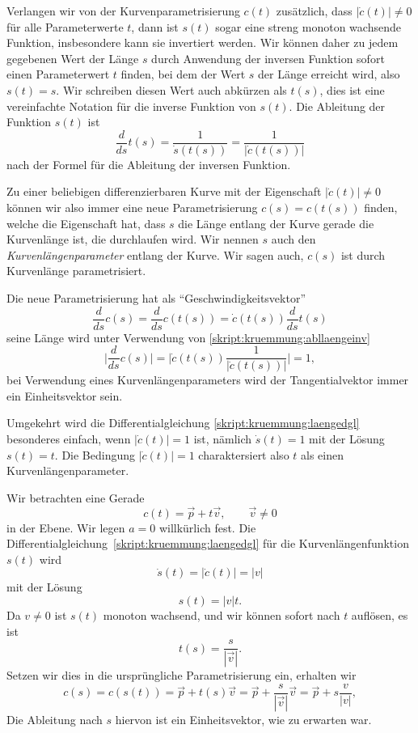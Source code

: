 Verlangen wir von der Kurvenparametrisierung $c(t)$ zusätzlich,
dass $|\dot c(t)|\ne 0$ für alle Parameterwerte $t$, dann ist
$s(t)$ sogar eine streng monoton wachsende Funktion, insbesondere
kann sie invertiert werden.
Wir können daher zu jedem gegebenen Wert der Länge $s$ durch
Anwendung der inversen Funktion sofort einen Parameterwert $t$
finden, bei dem der Wert $s$ der Länge erreicht wird, also
$s(t)=s$.
Wir schreiben diesen Wert auch abkürzen als $t(s)$, dies ist eine
vereinfachte Notation für die inverse Funktion von $s(t)$.
Die Ableitung der Funktion $s(t)$ ist
\begin{equation}
\frac{d}{ds} t(s) = \frac{1}{\dot s(t(s))} = \frac1{|\dot c(t(s))|}
\label{skript:kruemmung:abllaengeinv}
\end{equation}
nach der Formel für die Ableitung der inversen Funktion.

Zu einer beliebigen differenzierbaren Kurve mit der Eigenschaft
$|\dot c(t)|\ne 0$ können wir also immer eine neue Parametrisierung
$c(s)=c(t(s))$ finden, welche die Eigenschaft hat, dass $s$ die
Länge entlang der Kurve gerade die Kurvenlänge ist, die durchlaufen
wird.
Wir nennen $s$ auch den {\em Kurvenlängenparameter} entlang der
Kurve.
Wir sagen auch, $c(s)$ ist durch Kurvenlänge parametrisiert.

Die neue Parametrisierung hat als ``Geschwindigkeitsvektor''
\[
\frac{d}{ds} c(s)
=
\frac{d}{ds} c(t(s))
=
\dot c(t(s)) \frac{d}{ds}t(s)
\]
seine Länge wird unter Verwendung von
\eqref{skript:kruemmung:abllaengeinv}
\[
\biggl|
\frac{d}{ds} c(s)
\biggr|
=
\biggl|\dot c(t(s))\frac1{|\dot c(t(s))|}\biggr|
=
1,
\]
bei Verwendung eines Kurvenlängenparameters wird der Tangentialvektor
immer ein Einheitsvektor sein.

Umgekehrt wird die Differentialgleichung \eqref{skript:kruemmung:laengedgl}
besonderes einfach, wenn $|\dot c(t)|=1$ ist, nämlich $\dot s(t)=1$ mit
der Lösung $s(t)=t$.
Die Bedingung $|\dot c(t)|=1$ charaktersiert also $t$ als einen
Kurvenlängenparameter.

\begin{beispiel}
Wir betrachten eine Gerade 
\[
c(t)=\vec p + t\vec v,\qquad \vec v\ne 0
\]
in der Ebene.
Wir legen $a=0$ willkürlich fest.
Die Differentialgleichung~\eqref{skript:kruemmung:laengedgl} für die
Kurven\-längen\-funktion $s(t)$ wird
\[
\dot s(t) = |\dot c(t)| = |v|
\]
mit der Lösung
\[
s(t)=|v|t.
\]
Da $v\ne 0$ ist $s(t)$ monoton wachsend, und wir können sofort nach
$t$ auflösen, es ist
\[
t(s)=\frac{s}{|\vec v|}.
\]
Setzen wir dies in die ursprüngliche Parametrisierung ein, erhalten
wir
\[
c(s)
=
c(s(t))
=
\vec p + t(s)\vec v
=
\vec p + \frac{s}{|\vec v|}\vec v
=
\vec p + s\frac{v}{|v|},
\]
Die Ableitung nach $s$ hiervon ist ein Einheitsvektor, wie zu erwarten
war.
\end{beispiel}


